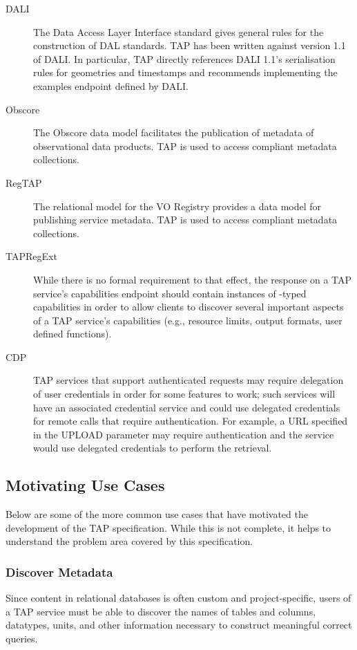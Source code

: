 \documentclass[11pt,letter]{ivoa}
\begin{document}
\begin{description}
\item[DALI \citep{2017ivoa.spec.0517D}]  The Data Access Layer Interface standard
gives general rules for the construction of DAL standards.  TAP has been
written against version 1.1 of DALI.  In particular, TAP directly
references DALI 1.1's serialisation rules for geometries and timestamps
and recommends implementing the examples endpoint defined by DALI.

\item[Obscore \citep{2017ivoa.spec.0509L}] The Obscore data model
facilitates the publication of metadata of observational data products.
TAP is used to access compliant metadata collections.

\item[RegTAP \citep{2014ivoa.spec.1208D}]  The relational model for the
VO Registry provides a data model for publishing service metadata.
TAP is used to access compliant metadata collections.

\item[TAPRegExt \citep{2012ivoa.spec.0827D}] While there is no formal
requirement to that effect, the response on a TAP service's capabilities
endpoint should contain instances of -typed
capabilities in order to allow clients to discover several important
aspects of a TAP service's capabilities (e.g., resource limits, output
formats, user defined functions).

\item[CDP \citep{2010ivoa.spec.0218P}] TAP services that support authenticated requests may require 
delegation of user credentials in order for some features to work; such services
will have an associated credential service and could use delegated credentials for 
remote calls that require authentication. For example, a URL specified in the UPLOAD
parameter may require authentication and the service would use delegated credentials
to perform the retrieval.
\end{description}

\subsection{Motivating Use Cases}
Below are some of the more common use cases that have motivated the development 
of the TAP specification. While this is not complete, it helps to understand the 
problem area covered by this specification.

\subsubsection{Discover Metadata}
Since content in relational databases is often custom and project-specific, 
users of a TAP service must be able to discover the names of tables and 
columns, datatypes, units, and other information necessary to construct 
meaningful correct queries.
\end{document}
